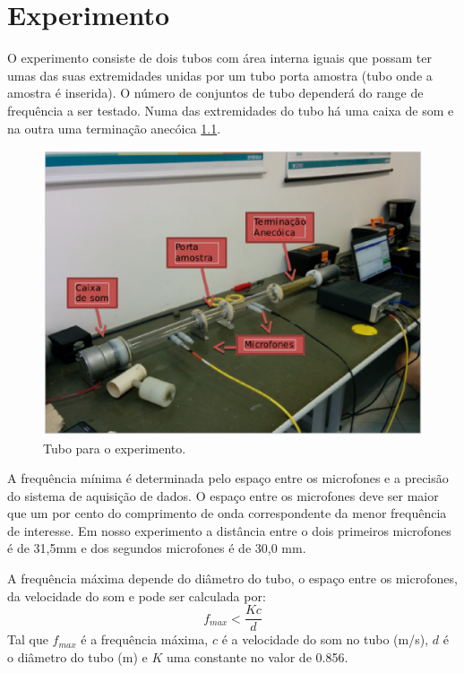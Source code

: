 \chapter{Experimento}\label{descricao}

O experimento consiste de dois tubos com área interna iguais que possam ter umas das suas extremidades unidas por um tubo porta amostra (tubo onde a amostra é inserida). O número de conjuntos de tubo dependerá do range de frequência a ser testado. Numa das extremidades do tubo há uma caixa de som e na outra uma terminação anecóica \ref{tubo}.

\begin{figure}[h]
\centering
\includegraphics[scale=0.72]{tubo.eps}
\caption{Tubo para o experimento.}
\label{tubo}
\end{figure}

A frequência mínima é determinada pelo espaço entre os microfones e a precisão do sistema de aquisição de dados. O espaço entre os microfones deve ser maior que um por cento do comprimento de onda correspondente da menor frequência de interesse. Em nosso experimento a distância entre o dois primeiros microfones é de 31,5mm e dos segundos microfones é de 30,0 mm.

A frequência máxima depende do diâmetro do tubo, o espaço entre os microfones, da velocidade do som e pode ser calculada por:
\begin{equation}
    f_{max} < \frac{Kc}{d}
\end{equation}
Tal que $f_{max}$ é a frequência máxima, $c$ é a velocidade do som no tubo (m/s), $d$ é o diâmetro do tubo (m) e $K$ uma constante no valor de 0.856.

